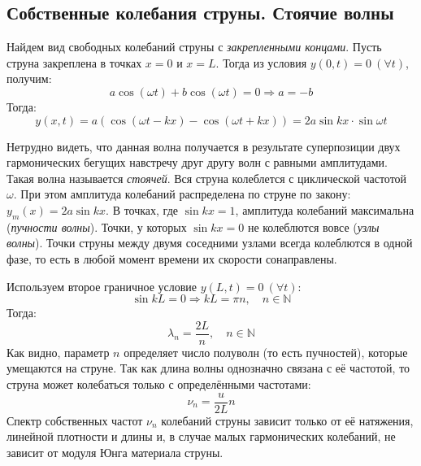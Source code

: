 \subsection{Собственные колебания струны. Стоячие волны} 

\noindent
Найдем вид свободных колебаний струны с \textit{закрепленными концами}. Пусть струна закреплена в точках $x = 0$ и $x = L$. Тогда из условия $y(0, t) = 0 \ (\forall t)$, получим:
\begin{equation}
a \cos(\omega t) + b \cos(\omega t) = 0 \Rightarrow a = -b
\end{equation} 
Тогда:
\begin{equation}\label{eq9}
y(x,t) = a(\cos(\omega t - k x) - \cos(\omega t + k x)) = 2 a \sin{kx} \cdot \sin{\omega t}
\end{equation}

\noindent
Нетрудно видеть, что данная волна получается в результате суперпозиции двух гармонических бегущих навстречу друг другу волн с равными амплитудами. Такая волна называется \textit{стоячей}. Вся струна колеблется с циклической частотой $\omega$. При этом амплитуда колебаний распределена по струне по закону: $y_m(x) = 2 a \sin{kx}$. В точках, где $\sin{kx} = 1$, амплитуда колебаний максимальна (\textit{пучности волны}). Точки, у которых $\sin{kx} = 0$ не колеблются вовсе (\textit{узлы волны}). Точки струны между двумя соседними узлами всегда колеблются в одной фазе, то есть в любой момент времени их скорости сонаправлены.

\noindent
Используем второе граничное условие $y(L, t) = 0 \ (\forall t)$:
\begin{equation}
\sin{kL} = 0 \Rightarrow kL = \pi n, \quad n \in \mathbb {N} 
\end{equation}
Тогда:
\begin{equation}
\lambda_n = \frac{2L}{n}, \quad n \in \mathbb{N}
\end{equation}
Как видно, параметр $n$ определяет число полуволн (то есть пучностей), которые умещаются на струне. Так как длина волны однозначно связана с её частотой, то струна может колебаться только с определёнными частотами:
\begin{equation}\label{eq12}
\nu_n = \frac{u}{2L} n
\end{equation}
Спектр собственных частот $\nu_n$ колебаний струны зависит только от её натяжения, линейной плотности и длины и, в случае малых гармонических колебаний, не зависит от модуля Юнга материала струны.

